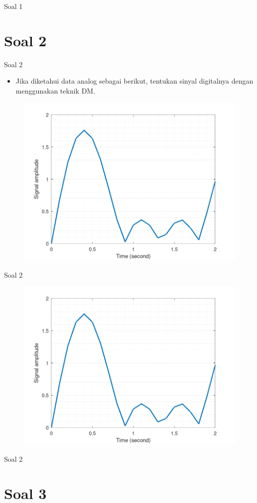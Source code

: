 \documentclass[aspectratio=169]{beamer}
\begin{document}
\begin{frame}[t]{Soal 1}

\end{frame}


\section{Soal 2}

\begin{frame}[t]{Soal 2}
	\begin{itemize}
		\item Jika diketahui data analog sebagai berikut, tentukan sinyal digitalnya dengan menggunakan teknik DM.
	\end{itemize}
	\begin{figure}
		\centering
		\includegraphics[width=0.5\linewidth]{../../../soal/kuis/soal2_kuis2}
	\end{figure}
\end{frame}

\begin{frame}[t]{Soal 2}
	\begin{figure}
		\centering
		\includegraphics[width=0.5\linewidth]{../../../soal/kuis/soal2_kuis2}
	\end{figure}
\end{frame}

\begin{frame}[t]{Soal 2}
	
\end{frame}


\section{Soal 3}
\end{document}
